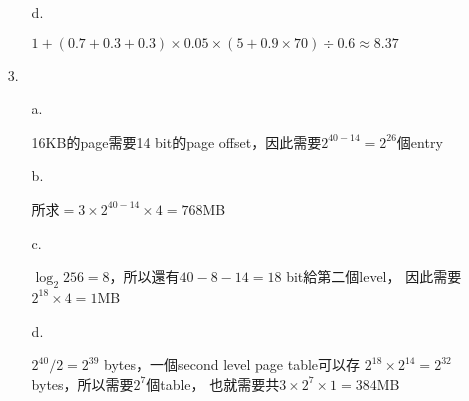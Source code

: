 \documentclass{article}
\begin{document}
\begin{enumerate}
\begin{enumerate}
			\item[d.]

				\(1 + (0.7 + 0.3 + 0.3) \times 0.05 \times
				(5 + 0.9 \times 70) \div 0.6 \approx 8.37\)
		\end{enumerate}

	\item[3.]

		\begin{enumerate}
			\item[a.]

				16KB的page需要14 bit的page offset，因此需要\(2^{40 - 14} = 2^{26}\)個entry

			\item[b.]

				所求\(=3 \times 2^{40 - 14} \times 4 = 768\)MB
			\item[c.]

				\(\log_2 256 = 8\)，所以還有\(40 - 8 - 14 = 18\) bit給第二個level，
				因此需要\(2^{18} \times 4 = 1\)MB

			\item[d.]

				\(2^{40} / 2 = 2^{39}\) bytes，一個second level page table可以存
				\(2^18 \times 2^{14} = 2^{32}\) bytes，所以需要\(2^7\)個table，
				也就需要共\(3 \times 2^7 \times 1 = 384\)MB
		\end{enumerate}
\end{enumerate}
\end{document}
